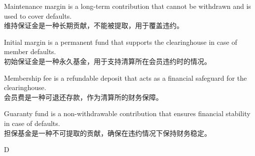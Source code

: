 \documentclass{article}
\begin{document}
                    \begin{choices}
                        \item Maintenance margin is a long-term contribution that cannot be withdrawn and is used to cover defaults.\\
                        维持保证金是一种长期贡献，不能被提取，用于覆盖违约。
                        
                        \item Initial margin is a permanent fund that supports the clearinghouse in case of member defaults.\\
                        初始保证金是一种永久基金，用于支持清算所在会员违约时的情况。
                        
                        \item Membership fee is a refundable deposit that acts as a financial safeguard for the clearinghouse.\\
                        会员费是一种可退还存款，作为清算所的财务保障。
                        
                        \item Guaranty fund is a non-withdrawable contribution that ensures financial stability in case of defaults.\\
                        担保基金是一种不可提取的贡献，确保在违约情况下保持财务稳定。
                    \end{choices}
                    
                    \begin{correctanswer}
                    D
                    \end{correctanswer}
                    
\end{document}
